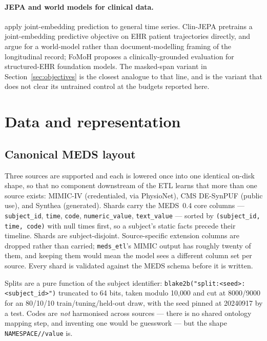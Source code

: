 \documentclass[11pt,a4paper]{article}
\newcommand{\code}[1]{\texttt{\small #1}}
\begin{document}
\paragraph{JEPA and world models for clinical data.}
\citet{tsjepa} apply joint-embedding prediction to general time series.
Clin-JEPA \citep{clinjepa} pretrains a joint-embedding predictive objective on
EHR patient trajectories directly, and \citet{smbstructure} argue for a
world-model rather than document-modelling framing of the longitudinal record;
FoMoH \citep{fomoh} proposes a clinically-grounded evaluation for structured-EHR
foundation models. The masked-span variant in Section~\ref{sec:objectives} is
the closest analogue to that line, and is the variant that does not clear its
untrained control at the budgets reported here.

\section{Data and representation}
\label{sec:data}

\subsection{Canonical MEDS layout}

Three sources are supported and each is lowered once into one identical on-disk
shape, so that no component downstream of the ETL learns that more than one
source exists: MIMIC-IV (credentialed, via PhysioNet), CMS DE-SynPUF (public
use), and Synthea (generated). Shards carry the MEDS~0.4 core columns
--- \code{subject\_id}, \code{time}, \code{code}, \code{numeric\_value},
\code{text\_value} --- sorted by \code{(subject\_id, time, code)} with null
times first, so a subject's static facts precede their timeline. Shards are
subject-disjoint. Source-specific extension columns are dropped rather than
carried; \code{meds\_etl}'s MIMIC output has roughly twenty of them, and keeping
them would mean the model sees a different column set per source. Every shard
is validated against the MEDS schema before it is written.

Splits are a pure function of the subject identifier:
\code{blake2b("split:\textless seed\textgreater:\textless subject\_id\textgreater")}
truncated to 64 bits, taken modulo 10{,}000 and cut at 8000/9000 for an
80/10/10 train/tuning/held-out draw, with the seed pinned at 20240917 by a
test. Codes are \emph{not} harmonised across sources --- there is no shared
ontology mapping step, and inventing one would be guesswork --- but the shape
\code{NAMESPACE//value} is.
\end{document}
